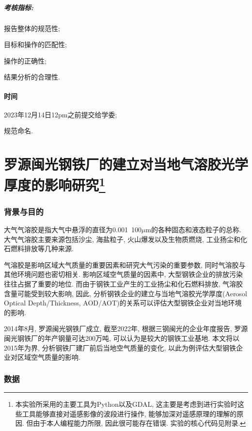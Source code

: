 \documentclass{ctexart}
\begin{document}
\begin{sloppypar}
\subsubsection*{\songti\textbf{ 考核指标:}}
报告整体的规范性; 

目标和操作的匹配性; 

操作的正确性;

结果分析的合理性.

\subsection*{\songti\textbf{ 时间}}
2023年12月14日12pm之前提交给学委; 

规范命名. 
\newpage
\part*{罗源闽光钢铁厂的建立对当地气溶胶光学厚度的影响研究\footnote{本实验所采用的主要工具为Python以及GDAL, 这主要是考虑到进行实验时这些工具能够直接对遥感影像的波段进行操作, 能够加深对遥感原理的理解的原因. 但由于本人编程能力所限, 因此很可能存在错误. 实验的核心代码见附录.}}
\section{背景与目的}
大气气溶胶是指大气中悬浮的直径为0.001~100$\mu$m的各种固态和液态粒子的总称. 大气气溶胶主要来源包括沙尘, 海盐粒子, 火山爆发以及生物质燃烧, 工业扬尘和化石燃料排放等几种来源\cite{陶金花李小英-705, 邵振峰-704}. 

气溶胶是影响区域大气质量的重要因素和研究大气污染的重要参数, 同时气溶胶与其他环境问题也密切相关. 
影响区域空气质量的因素中, 大型钢铁企业的排放污染往往占据了重要的地位. 而由于钢铁工业产生的工业扬尘和化石燃料排放, 气溶胶含量可能受到较大影响, 因此, 分析钢铁企业的建立与当地气溶胶光学厚度(Aerosol Optical Depth/Thickness, AOD/AOT)的关系可以评估大型钢铁企业对当地环境的影响. 

2014年8月, 罗源闽光钢铁厂成立, 截至2022年, 根据三钢闽光的企业年度报告, 罗源闽光钢铁厂的年产钢量可达200万吨, 可以认为是较大的钢铁工业基地. 本文将以2015年为界, 分析钢铁厂建厂前后当地空气质量的变化, 以此为例评估大型钢铁企业对区域空气质量的影响. 

\section{数据}

\end{sloppypar}
\end{document}
